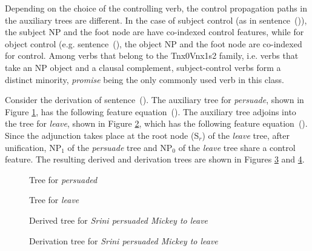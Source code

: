Depending on the choice of the controlling verb, the control
propagation paths in the auxiliary trees are different.  In the case of subject
control (as in sentence~()), the subject NP and the foot node are
have co-indexed control features, while for object control
(e.g. sentence~(), the object NP and the foot node are 
co-indexed for control. Among verbs that belong to the Tnx0Vnx1s2 family,
i.e. verbs that take an NP object and a clausal complement, subject-control
verbs form a distinct minority, {\em promise} being the only commonly used
verb in this class.


Consider the derivation of sentence~(). The auxiliary tree for
{\em persuade}, shown in Figure \ref{persuade-tree}, has the following
feature equation~().
The auxiliary tree adjoins into the tree for {\em leave}, shown in
Figure \ref{leave-tree}, which 
has the following feature equation~().
Since the adjunction takes place at the root node (S$_{r}$) of the
{\em leave} tree, after unification, NP$_{1}$ of the {\em persuade}
tree and NP$_{0}$ of the {\em leave} tree share a control feature. The
resulting derived and derivation trees are shown in Figures
\ref{derived-tree} and \ref{derivation-tree}.

\begin{figure}[hbt]
\centering
\hspace{0.0in}
\caption{Tree for {\it persuaded}}
\label{persuade-tree}
\end{figure}

\begin{figure}[hbt]
\centering
\hspace{0.0in}
\caption{Tree for {\it leave}}
\label{leave-tree}
\end{figure}

\begin{figure}[hbt]
\centering
\hspace{0.0in}
\caption{Derived tree for {\it Srini persuaded Mickey to leave}}
\label{derived-tree}
\end{figure}

\begin{figure}[hbt]
\centering
\hspace{0.0in}
\caption{Derivation tree for {\it Srini persuaded Mickey to leave}}
\label{derivation-tree}
\end{figure}


